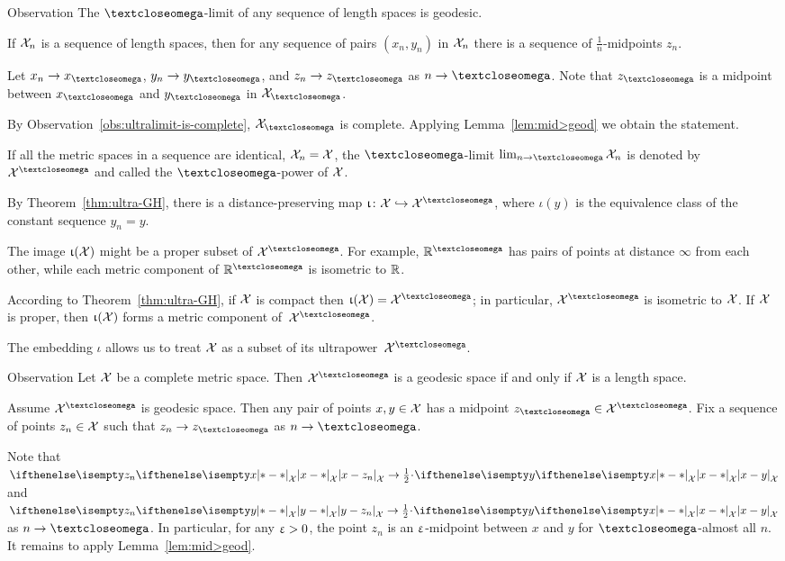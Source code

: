 \begin{thm}{Observation}\label{obs:ultralimit-is-geodesic}
The $\o$-limit of any sequence of length spaces is geodesic. 
\end{thm}

If $\mathcal{X}_n$ is a sequence of length spaces, then for any sequence of pairs $(x_n, y_n)$ in $\mathcal{X}_n$ there is a sequence of $\tfrac1n$-midpoints $z_n$.

Let $x_n\to x_\o$, $y_n\to y_\o$, and $z_n\to z_\o$ as $n\to \o$.
Note that $z_\o$ is a midpoint between $x_\o$ and $y_\o$ in $\spc{X}_\o$.

By Observation~\ref{obs:ultralimit-is-complete}, $\spc{X}_\o$ is complete.
Applying Lemma~\ref{lem:mid>geod} we obtain the statement.
\qeds

 If all the metric spaces in a sequence are identical, $\spc{X}_n\z=\spc{X}$, 
the $\o$-limit 
$\lim_{n\to\o}\spc{X}_n$
is denoted by $\spc{X}^\o$
and called the  $\o$-power of $\mathcal{X}$.
 
By Theorem~\ref{thm:ultra-GH},
there is a distance-preserving map
$\iota\:\spc{X}\hookrightarrow \spc{X}^\o$, where $\iota(y)$ is the equivalence class of the constant sequence $y_n=y$. 

The image $\upiota(\mathcal{X})$ might be a proper subset of $\spc{X}^\o$.
For example, $\RR^\o$ has pairs of points at distance $\infty$ from each other, while each metric component of $\RR^\o$ is isometric to $\mathbb{R}$.

According to Theorem~\ref{thm:ultra-GH}, 
if $\mathcal{X}$ is compact then $\iota(\spc{X})=\spc{X}^\o$;
in particular, $\spc{X}^\o$ is isometric to $\mathcal{X}$.
If $\mathcal{X}$ is proper, then $\upiota(\mathcal{X})$ forms a metric component of~$\spc{X}^\o$.

The embedding $\iota$ allows us to treat $\mathcal{X}$ as a subset of its ultrapower~$\spc{X}^\o$. 

\begin{thm}{Observation}\label{obs:ultrapower-is-geodesic}
Let $\mathcal{X}$ be a complete metric space. 
Then $\spc{X}^\o$ is a geodesic space if and only if $\mathcal{X}$ is a length space.
\end{thm}

Assume $\spc{X}^\o$ is geodesic space.
Then any pair of points $x,y\in \spc{X}$ has a midpoint $z_\o\in\spc{X}^\o$.
Fix a sequence of points $z_n\in  \spc{X}$ such that $z_n\to z_\o$ as $n\to \o$.

Note that 
$\dist{x}{z_n}{\spc{X}}\to \tfrac12\cdot \dist{x}{y}{\spc{X}}$
and 
$\dist{y}{z_n}{\spc{X}}\to \tfrac12\cdot \dist{x}{y}{\spc{X}}$
as 
$n\to\o$.
In particular, for any $\upvarepsilon>0$, the point $z_n$ is an $\upvarepsilon$-midpoint between $x$ and $y$ for $\o$-almost all $n$.
It remains to apply Lemma~\ref{lem:mid>geod}.

